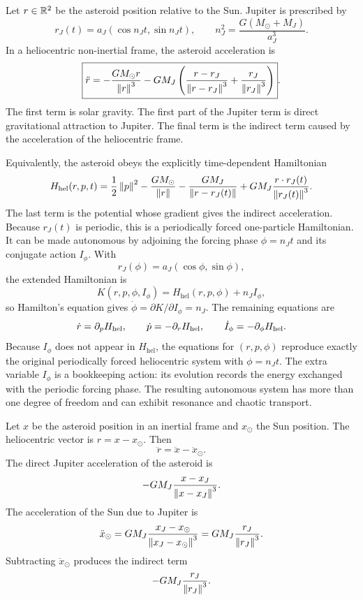 Let \(r\in\mathbb{R}^2\) be the asteroid position relative to the Sun. Jupiter is
prescribed by
\[
  r_J(t)=a_J(\cos n_Jt,\sin n_Jt),
  \qquad
  n_J^2=\frac{G(M_\odot+M_J)}{a_J^3}.
\]
In a heliocentric non-inertial frame, the asteroid acceleration is
\[
  \boxed{
  \ddot r
  =
  -\frac{GM_\odot r}{\left\lVert r\right\rVert^3}
  -
  GM_J
  \left(
    \frac{r-r_J}{\left\lVert r-r_J\right\rVert^3}
    +
    \frac{r_J}{\left\lVert r_J\right\rVert^3}
  \right)
  }.
\]
The first term is solar gravity. The first part of the Jupiter term is direct
gravitational attraction to Jupiter. The final term is the indirect term caused
by the acceleration of the heliocentric frame.

Equivalently, the asteroid obeys the explicitly time-dependent Hamiltonian
\[
  H_{\mathrm{hel}}(r,p,t)
  =
  \frac12\left\lVert p\right\rVert^2
  -
  \frac{GM_\odot}{\left\lVert r\right\rVert}
  -
  \frac{GM_J}{\left\lVert r-r_J(t)\right\rVert}
  +
  GM_J\frac{r\cdot r_J(t)}{\left\lVert r_J(t)\right\rVert^3}.
\]
The last term is the potential whose gradient gives the indirect acceleration.
Because \(r_J(t)\) is periodic, this is a periodically forced one-particle
Hamiltonian. It can be made autonomous by adjoining the forcing phase
\(\phi=n_Jt\) and its conjugate action \(I_\phi\). With
\[
  r_J(\phi)=a_J(\cos\phi,\sin\phi),
\]
the extended Hamiltonian is
\[
  K(r,p,\phi,I_\phi)
  =
  H_{\mathrm{hel}}(r,p,\phi)+n_JI_\phi,
\]
so Hamilton's equation gives \(\dot\phi=\partial K/\partial I_\phi=n_J\). The
remaining equations are
\[
  \dot r=\partial_p H_{\mathrm{hel}},
  \qquad
  \dot p=-\partial_r H_{\mathrm{hel}},
  \qquad
  \dot I_\phi=-\partial_\phi H_{\mathrm{hel}}.
\]
Because \(I_\phi\) does not appear in \(H_{\mathrm{hel}}\), the equations for
\((r,p,\phi)\) reproduce exactly the original periodically forced
heliocentric system with \(\phi=n_Jt\).  The extra variable \(I_\phi\) is a
bookkeeping action: its evolution records the energy exchanged with the
periodic forcing phase.  The resulting autonomous system has more than one
degree of freedom and can exhibit resonance and chaotic transport.

\begin{derivation}
Let \(x\) be the asteroid position in an inertial frame and \(x_\odot\) the Sun
position. The heliocentric vector is \(r=x-x_\odot\). Then
\[
  \ddot r=\ddot x-\ddot x_\odot.
\]
The direct Jupiter acceleration of the asteroid is
\[
  -GM_J\frac{x-x_J}{\left\lVert x-x_J\right\rVert^3}.
\]
The acceleration of the Sun due to Jupiter is
\[
  \ddot x_\odot=
  GM_J\frac{x_J-x_\odot}{\left\lVert x_J-x_\odot\right\rVert^3}
  =
  GM_J\frac{r_J}{\left\lVert r_J\right\rVert^3}.
\]
Subtracting \(\ddot x_\odot\) produces the indirect term
\[
  -GM_J\frac{r_J}{\left\lVert r_J\right\rVert^3}.
\]
\end{derivation}

